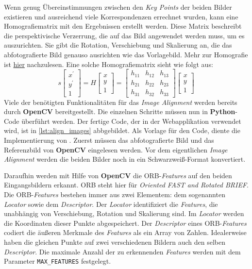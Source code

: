 Wenn genug Übereinstimmungen zwischen den \textit{Key Points} der beiden Bilder existieren und ausreichend viele Korrespondenzen errechnet wurden, kann eine 
Homografiematrix mit den Ergebnissen erstellt werden. Diese Matrix beschreibt die perspektivische Verzerrung, die auf das Bild angewendet werden muss, um es
auszurichten. Sie gibt die Rotation, Verschiebung und Skalierung an, die das abfotografierte Bild genauso ausrichten wie das Vorlagebild. Mehr zur Homografie
ist \hyperref{https://docs.opencv.org/4.x/d9/dab/tutorial_homography.html}{}{}{hier} nachzulesen.\cite{rosebrock} Eine solche Homografiematrix sieht wie folgt aus:
\[s \begin{bmatrix} x^{'} \\ y^{'} \\ 1 \end{bmatrix} 
= H \begin{bmatrix} x \\ y \\ 1 \end{bmatrix} 
= \begin{bmatrix} h_{11} & h_{12} & h_{13} \\ h_{21} & h_{22} & h_{23} \\ h_{31} & h_{32} & h_{33} \end{bmatrix} 
\begin{bmatrix} x \\ y \\ 1 \end{bmatrix}\]
Viele der benötigten Funktionalitäten für das \textit{Image Alignment} werden bereits durch \textbf{OpenCV} bereitgestellt.
Die einzelnen Schritte müssen nun in \textbf{Python}-Code überführt werden. Der fertige Code, der in der Webapplikation verwendet wird, ist in \ref{lst:align_images}
abbgebildet. Als Vorlage für den Code, diente die Implementierung von \citeauthor{rosebrock}. Zuerst müssen das abfotografierte Bild und das Referenzbild
von \textbf{OpenCV} eingelesen werden. Vor dem eigentlichen \textit{Image Alignment} werden die beiden Bilder noch in ein Schwarzweiß-Format konvertiert.

Daraufhin werden mit Hilfe von \textbf{OpenCV} die ORB-\textit{Features} auf den beiden Eingangsbildern erkannt.
ORB steht hier für \textit{Oriented FAST and Rotated BRIEF}. Die ORB-\textit{Features} bestehen immer aus zwei Elementem: dem sogenannten 
\textit{Locator} sowie dem \textit{Descriptor}. Der \textit{Locator} identifiziert die \textit{Features}, die unabhängig von Verschiebung, Rotation und Skalierung
sind. Im \textit{Locator} werden die Koordinaten dieser Punkte abgespeichert. Der \textit{Descriptor} eines ORB-\textit{Features} codiert die äußeren Merkmale
des \textit{Features} als ein Array von Zahlen. Idealerweise haben die gleichen Punkte auf zwei verschiedenen Bildern auch den selben \textit{Descriptor}.
Die maximale Anzahl der zu erkennenden \textit{Features} werden mit dem Parameter \texttt{MAX\_FEATURES} festgelegt.

